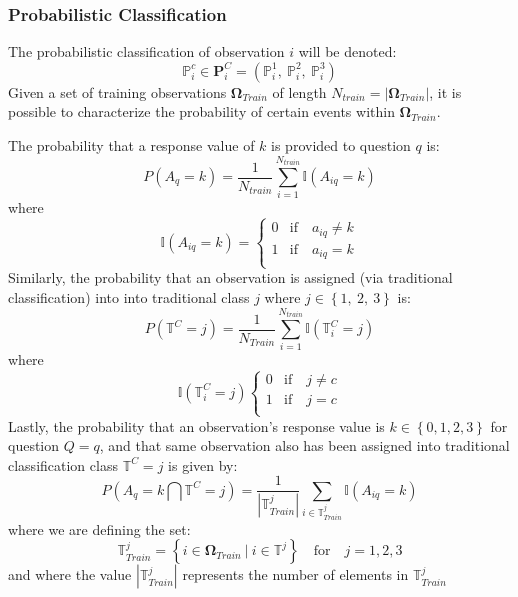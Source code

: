 \documentclass[12pt,]{article}
\begin{document}
\hypertarget{probabilistic-classification}{%
\subsubsection{Probabilistic
Classification}\label{probabilistic-classification}}

The probabilistic classification of observation \(i\) will be denoted:
\[\mathbb{P}_{i}^{c} \in \mathbf{P}_{i}^{C}=(\mathbb{P}_{i}^{1}, \ \mathbb{P}_{i}^{2}, \ \mathbb{P}_{i}^{3})\]
Given a set of training observations \(\mathbf{\Omega}_{Train}\) of
length \(N_{train}=|\mathbf{\Omega}_{Train}|\), it is possible to
characterize the probability of certain events within
\(\mathbf{\Omega}_{Train}\).

The probability that a response value of \(k\) is provided to question
\(q\) is:
\[P\left(A_{q}=k \right) = \frac{1}{N_{train}} \sum_{i=1}^{N_{train}} \mathbb{I}\left(A_{iq}=k \right)\]
where \[\mathbb{I}\left(A_{iq} = k \right)=
      \begin{cases}
        0 &\mbox{if} \quad  a_{iq} \neq k \\
        1 &\mbox{if} \quad  a_{iq}=k \\  
      \end{cases}
      \] Similarly, the probability that an observation is assigned (via
traditional classification) into into traditional class \(j\) where
\(j \in \left \{ 1, \ 2, \ 3 \right \}\) is:
\[P\left( \mathbb{T}^{C}=j \right) = \frac{1}{N_{Train}} \sum_{i=1}^{N_{train}} \mathbb{I}\left(\mathbb{T}_{i}^{C}=j \right)\]
where \[\mathbb{I}\left(\mathbb{T}_{i}^{C}=j \right)
      \begin{cases}
        0 &\mbox{if} \quad  j \neq c \\
        1 &\mbox{if} \quad  j = c \\  
      \end{cases}
      \] Lastly, the probability that an observation's response value is
\(k \in \left \{ 0, 1, 2, 3 \right \}\) for question \(Q=q\), and that
same observation also has been assigned into traditional classification
class \(\mathbb{T}^{C}=j\) is given by:
\[P\left(A_{q} = k \bigcap \mathbb{T}^{C}=j   \right) =  \frac{1}{|\mathbb{T}_{Train}^{j}|} \sum_{i \in \mathbb{T}_{Train}^{j}} \mathbb{I} \left(A_{iq}=k \right) \]
where we are defining the set:
\[\mathbb{T}_{Train}^{j}= \left \{  i \in \mathbf{\Omega}_{Train} \ \Big | \ i \in \mathbb{T}^{j} \right \} \quad \text{for} \quad j=1,2,3\]
and where the value \(|\mathbb{T}_{Train}^{j}|\) represents the number
of elements in \(\mathbb{T}_{Train}^{j}\)
\end{document}
